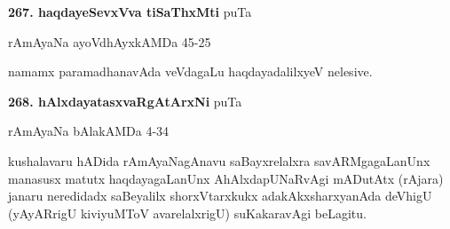 \medskip
\noindent\textbf{267. haqdayeSevxVva tiSaThxMti} \hfill puTa \pageref{162b}

\hfill rAmAyaNa ayoVdhAyxkAMDa 45-25

namamx paramadhanavAda veVdagaLu haqdayadalilxyeV nelesive.

\medskip
\noindent\textbf{268. hAlxdayatasxvaRgAtArxNi} \hfill puTa \pageref{189c}

\hfill rAmAyaNa bAlakAMDa 4-34

kushalavaru hADida rAmAyaNagAnavu saBayxrelalxra savARMgagaLanUnx manasusx matutx haqdayagaLanUnx AhAlxdapUNaRvAgi mADutAtx (rAjara) janaru neredidadx saBeyalilx shorxVtarxkukx adakAkxsharxyanAda deVhigU (yAyARrigU kiviyuMToV avarelalxrigU) suKakaravAgi beLagitu.
